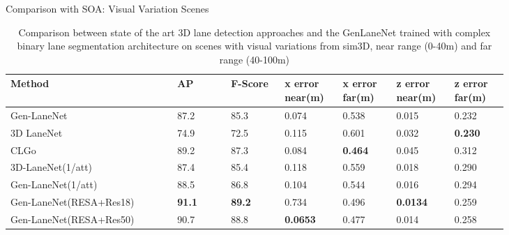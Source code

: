 \documentclass[aspectratio=169]{beamer}
\begin{document}
\begin{frame}{Comparison with SOA: Visual Variation Scenes}
      \begin{table}[h]
      \small
    \centering
    \caption{Comparison between state of the art 3D lane detection approaches and the GenLaneNet  trained with complex binary lane segmentation architecture on scenes with visual variations from sim3D, near range (0-40m) and far range (40-100m)}
    \begin{tabular}{|p{0.29\linewidth}|p{0.09\linewidth}|p{0.09\linewidth}|p{0.09\linewidth}|p{0.09\linewidth}|p{0.09\linewidth}|p{0.09\linewidth}|}
    \hline
        \textbf{Method} & \textbf{AP} & \textbf{F-Score} & \textbf{x error near(m)} & \textbf{x error far(m)} & \textbf{z error near(m)} & \textbf{z error far(m)} \\ \hline
        Gen-LaneNet & 87.2 & 85.3 & 0.074 & 0.538 & 0.015 & 0.232 \\ \hline
        3D LaneNet & 74.9 & 72.5 & 0.115 & 0.601 & 0.032 & \textbf{0.230} \\ \hline
        CLGo & 89.2 & 87.3 & 0.084 & \textbf{0.464} & 0.045 & 0.312 \\ \hline
        3D-LaneNet(1/att) & 87.4 & 85.4 & 0.118 & 0.559 & 0.018 & 0.290 \\ \hline
        Gen-LaneNet(1/att) & 88.5 & 86.8 & 0.104 & 0.544 & 0.016 & 0.294 \\ \hline
        Gen-LaneNet(RESA+Res18) & \textbf{ 91.1} &\textbf{ 89.2} & 0.734 & 0.496 & \textbf{0.0134} & 0.259 \\ \hline
        Gen-LaneNet(RESA+Res50) & 90.7 & 88.8 & \textbf{0.0653} & 0.477 & 0.014 & 0.258 \\ \hline
    \end{tabular}
\end{table}
\end{frame}
\end{document}
